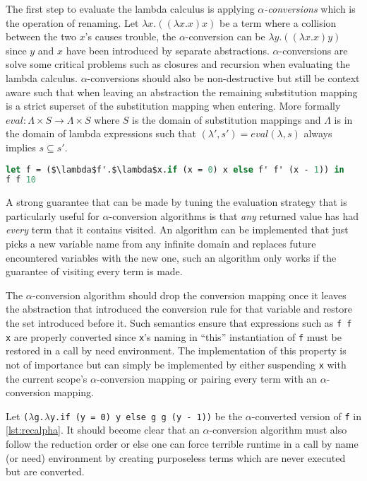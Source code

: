 \documentclass[11pt,oneside,a4paper]{report}
\begin{document}
The first step to evaluate the lambda calculus is applying \textit{$\alpha$-conversions} which is the operation of renaming.
Let $\lambda x . ((\lambda x . x) x)$ be a term where a collision between the two $x$'s causes trouble, the $\alpha$-conversion can be $\lambda y . ((\lambda x . x) y)$ since $y$ and $x$ have been introduced by separate abstractions.
$\alpha$-conversions are solve some critical problems such as closures and recursion when evaluating the lambda calculus.
$\alpha$-conversions should also be non-destructive but still be context aware such that when leaving an abstraction the remaining substitution mapping is a strict superset of the substitution mapping when entering.
More formally $\textit{eval}: \Lambda \times S \rightarrow \Lambda \times S$ where $S$ is the domain of substitution mappings and $\Lambda$ is in the domain of lambda expressions such that  $(\lambda',s') = eval(\lambda, s)$ always implies $s \subseteq s'$.
\begin{lstlisting}[language=ML,caption={Recursive addition function},label={lst:recalpha},mathescape=true]
let f = ($\lambda$f'.$\lambda$x.if (x = 0) x else f' f' (x - 1)) in
f f 10
\end{lstlisting}
A strong guarantee that can be made by tuning the evaluation strategy that is particularly useful for $\alpha$-conversion algorithms is that \textit{any} returned value has had \textit{every} term that it contains visited.
An algorithm can be implemented that just picks a new variable name from any infinite domain and replaces future encountered variables with the new one, such an algorithm only works if the guarantee of visiting every term is made.
\begin{remark}
The $\alpha$-conversion algorithm should drop the conversion mapping once it leaves the abstraction that introduced the conversion rule for that variable and restore the set introduced before it.
Such semantics ensure that expressions such as \texttt{f f x} are properly converted since \texttt{x}'s naming in ``this'' instantiation of \texttt{f} must be restored in a call by need environment.
The implementation of this property is not of importance but can simply be implemented by either suspending \texttt{x} with the current scope's $\alpha$-conversion mapping or pairing every term with an $\alpha$-conversion mapping.
\end{remark}
Let \texttt{($\lambda$g.$\lambda$y.if (y = 0) y else g g (y - 1))} be the $\alpha$-converted version of \texttt{f} in \autoref{lst:recalpha}.
It should become clear that an $\alpha$-conversion algorithm must also follow the reduction order or else one can force terrible runtime in a call by name (or need) environment by creating purposeless terms which are never executed but are converted.
\end{document}
